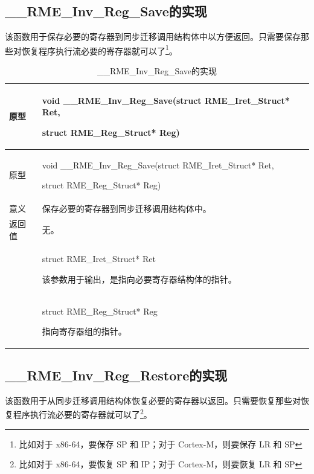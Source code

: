 \subsection{\_\_RME\_Inv\_Reg\_Save的实现}\label{subsec:7-rme-inv-reg-save-implementation}

该函数用于保存必要的寄存器到同步迁移调用结构体中以方便返回。只需要保存那些对恢复程序执行流必要的寄存器就可以了\footnote{比如对于 x86-64，要保存 SP 和 IP；对于 Cortex-M，则要保存 LR 和 SP}。

\begin{xltabular}{\textwidth}{@{}>{\hsize\raggedright\arraybackslash}X>{\hsize\raggedright\arraybackslash}X@{}}
\caption{\_\_RME\_Inv\_Reg\_Save的实现}\label{tab:7-66-rme-inv-reg-save-implementation}\\
\toprule
原型\strut
 & void \_\_RME\_Inv\_Reg\_Save(struct RME\_Iret\_Struct* Ret,

struct RME\_Reg\_Struct* Reg)\strut
\tabularnewline
\endfirsthead
\toprule
原型\strut
 & void \_\_RME\_Inv\_Reg\_Save(struct RME\_Iret\_Struct* Ret,

struct RME\_Reg\_Struct* Reg)\strut
\tabularnewline
\midrule
\endhead
\bottomrule
\endlastfoot
意义 & 保存必要的寄存器到同步迁移调用结构体中。\tabularnewline
返回值 & 无。\tabularnewline
{} & struct RME\_Iret\_Struct* Ret

该参数用于输出，是指向必要寄存器结构体的指针。\strut
\tabularnewline
\strut
 & struct RME\_Reg\_Struct* Reg

指向寄存器组的指针。\strut
\tabularnewline
\end{xltabular}

\subsection{\_\_RME\_Inv\_Reg\_Restore的实现}\label{subsec:7-rme-inv-reg-restore-implementation}

该函数用于从同步迁移调用结构体恢复必要的寄存器以返回。只需要恢复那些对恢复程序执行流必要的寄存器就可以了\footnote{比如对于 x86-64，要恢复 SP 和 IP；对于 Cortex-M，则要恢复 LR 和 SP}。

